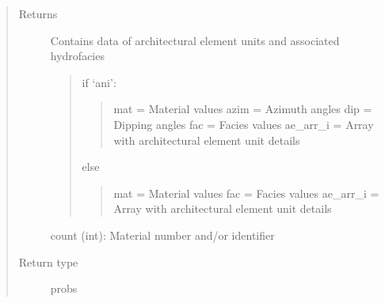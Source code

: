 \documentclass[letterpaper,10pt,english]{sphinxmanual}
\begin{document}
\begin{fulllineitems}
\begin{quote}
\begin{description}
\begin{itemize}
\end{itemize}

\item[{Returns}] \leavevmode

Contains data of architectural element units and associated hydrofacies
\begin{quote}

if `ani':
\begin{quote}

mat =                       Material values
azim =                      Azimuth angles
dip =                       Dipping angles
fac =                       Facies values
ae\_arr\_i =          Array with architectural element unit details
\end{quote}

else
\begin{quote}

mat =                       Material values
fac =                       Facies values
ae\_arr\_i =          Array with architectural element unit details
\end{quote}
\end{quote}

count (int):    Material number and/or identifier


\item[{Return type}] \leavevmode
probs

\end{description}\end{quote}

\end{fulllineitems}

\end{document}
